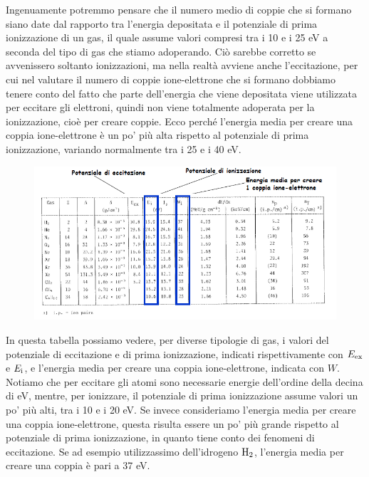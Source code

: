 Ingenuamente potremmo pensare che il numero medio di coppie che si formano siano date dal rapporto tra l'energia depositata e il potenziale di prima ionizzazione di un gas, il quale assume valori compresi tra i 10 e i 25 eV a seconda del tipo di gas che stiamo adoperando. Ciò sarebbe corretto se avvenissero soltanto ionizzazioni, ma nella realtà avviene anche l'eccitazione, per cui nel valutare il numero di coppie ione-elettrone che si formano dobbiamo tenere conto del fatto che parte dell'energia che viene depositata viene utilizzata per eccitare gli elettroni, quindi non viene totalmente adoperata per la ionizzazione, cioè per creare coppie. Ecco perché l'energia media per creare una coppia ione-elettrone è un po' più alta rispetto al potenziale di prima ionizzazione, variando normalmente tra i 25 e i 40 eV.

\begin{figure}[H]
   \centering
   \includegraphics[width=\textwidth]{immagini/potenziali_ionizzazione.png}
\end{figure}

In questa tabella possiamo vedere, per diverse tipologie di gas, i valori del potenziale di eccitazione e di prima ionizzazione, indicati rispettivamente con $E_{\rm ex}$ e $E_{\rm i}$, e l'energia media per creare una coppia ione-elettrone, indicata con $W$. Notiamo che per eccitare gli atomi sono necessarie energie dell'ordine della decina di eV, mentre, per ionizzare, il potenziale di prima ionizzazione assume valori un po' più alti, tra i 10 e i 20 eV. Se invece consideriamo l'energia media per creare una coppia ione-elettrone, questa risulta essere un po' più grande rispetto al potenziale di prima ionizzazione, in quanto tiene conto dei fenomeni di eccitazione. Se ad esempio utilizzassimo dell'idrogeno $\rm H_2$, l'energia media per creare una coppia è pari a 37 eV.

\vspace{0.4cm}

